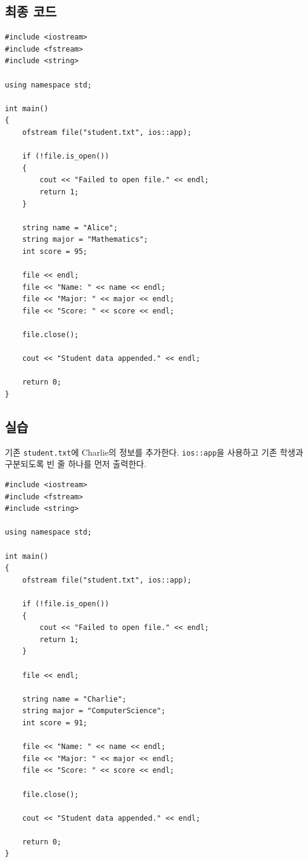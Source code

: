 \documentclass[11pt,a4paper]{article}
\begin{document}
\subsection{최종 코드}
\begin{lstlisting}
#include <iostream>
#include <fstream>
#include <string>

using namespace std;

int main()
{
    ofstream file("student.txt", ios::app);

    if (!file.is_open())
    {
        cout << "Failed to open file." << endl;
        return 1;
    }

    string name = "Alice";
    string major = "Mathematics";
    int score = 95;

    file << endl;
    file << "Name: " << name << endl;
    file << "Major: " << major << endl;
    file << "Score: " << score << endl;

    file.close();

    cout << "Student data appended." << endl;

    return 0;
}
\end{lstlisting}

\subsection{실습}
\begin{practicebox}
기존 \texttt{student.txt}에 Charlie의 정보를 추가한다.
\texttt{ios::app}을 사용하고 기존 학생과 구분되도록 빈 줄 하나를 먼저 출력한다.
\end{practicebox}

\begin{lstlisting}
#include <iostream>
#include <fstream>
#include <string>

using namespace std;

int main()
{
    ofstream file("student.txt", ios::app);

    if (!file.is_open())
    {
        cout << "Failed to open file." << endl;
        return 1;
    }

    file << endl;

    string name = "Charlie";
    string major = "ComputerScience";
    int score = 91;

    file << "Name: " << name << endl;
    file << "Major: " << major << endl;
    file << "Score: " << score << endl;

    file.close();

    cout << "Student data appended." << endl;

    return 0;
}
\end{lstlisting}
\end{document}
